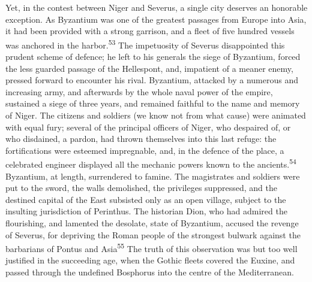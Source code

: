 Yet, in the contest between Niger and Severus, a single city
deserves an honorable exception. As Byzantium was one of the
greatest passages from Europe into Asia, it had been provided
with a strong garrison, and a fleet of five hundred vessels was
anchored in the harbor.\textsuperscript{53} The impetuosity of Severus
disappointed this prudent scheme of defence; he left to his
generals the siege of Byzantium, forced the less guarded passage
of the Hellespont, and, impatient of a meaner enemy, pressed
forward to encounter his rival. Byzantium, attacked by a numerous
and increasing army, and afterwards by the whole naval power of
the empire, sustained a siege of three years, and remained
faithful to the name and memory of Niger. The citizens and
soldiers (we know not from what cause) were animated with equal
fury; several of the principal officers of Niger, who despaired
of, or who disdained, a pardon, had thrown themselves into this
last refuge: the fortifications were esteemed impregnable, and,
in the defence of the place, a celebrated engineer displayed all
the mechanic powers known to the ancients.\textsuperscript{54} Byzantium, at
length, surrendered to famine. The magistrates and soldiers were
put to the sword, the walls demolished, the privileges
suppressed, and the destined capital of the East subsisted only
as an open village, subject to the insulting jurisdiction of
Perinthus. The historian Dion, who had admired the flourishing,
and lamented the desolate, state of Byzantium, accused the
revenge of Severus, for depriving the Roman people of the
strongest bulwark against the barbarians of Pontus and Asia\textsuperscript{55}
The truth of this observation was but too well justified in the
succeeding age, when the Gothic fleets covered the Euxine, and
passed through the undefined Bosphorus into the centre of the
Mediterranean.



